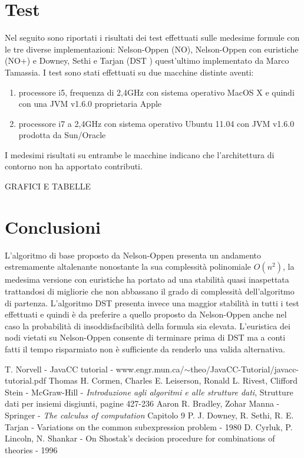 \documentclass[a4paper,11pt]{article}
\begin{document}
\section{Test}
Nel seguito sono riportati i risultati dei test effettuati sulle medesime formule con le tre diverse implementazioni: Nelson-Oppen (NO), Nelson-Oppen con euristiche (NO+) e Downey, Sethi e Tarjan (DST ) quest'ultimo implementato da Marco Tamassia.
I test sono stati effettuati su due macchine distinte aventi:
\begin{enumerate}
	\item processore i5, frequenza di 2,4GHz con sistema operativo MacOS X e quindi con una JVM v1.6.0 proprietaria Apple
	\item processore i7 a 2,4GHz con sistema operativo Ubuntu 11.04 con JVM v1.6.0 prodotta da Sun/Oracle
\end{enumerate}
I medesimi risultati su entrambe le macchine indicano che l'architettura di contorno non ha apportato contributi.

GRAFICI E TABELLE

\section{Conclusioni}
L'algoritmo di base proposto da Nelson-Oppen presenta un andamento estremamente altalenante nonostante la sua complessità polinomiale $O(n^2)$, la medesima versione con euristiche ha portato ad una stabilità quasi inaspettata trattandosi di migliorie che non abbassano il grado di complessità dell'algoritmo di partenza.
L'algoritmo DST presenta invece una maggior stabilità in tutti i test effettuati e quindi è da preferire a quello proposto da Nelson-Oppen anche nel caso la probabilità di insoddisfacibilità della formula sia elevata.
L'euristica dei nodi vietati su Nelson-Oppen consente di terminare prima di DST ma a conti fatti il tempo risparmiato non è sufficiente da renderlo una valida alternativa.


\begin{thebibliography}{1}
T. Norvell - JavaCC tutorial - www.engr.mun.ca/$\sim$theo/JavaCC-Tutorial/javacc-tutorial.pdf
Thomas H. Cormen, Charles E. Leiserson, Ronald L. Rivest, Clifford Stein - McGraw-Hill - \textit {Introduzione agli algoritmi e alle strutture dati}, Strutture dati per insiemi disgiunti, pagine 427-236
Aaron R. Bradley, Zohar Manna - Springer - \textit {The calculus of computation} Capitolo 9 
P. J. Downey, R. Sethi, R. E. Tarjan - Variations on the common subexpression problem - 1980
D. Cyrluk, P. Lincoln, N. Shankar - On Shostak's decision procedure for combinations of theories - 1996
\end{thebibliography}
\end{document}
